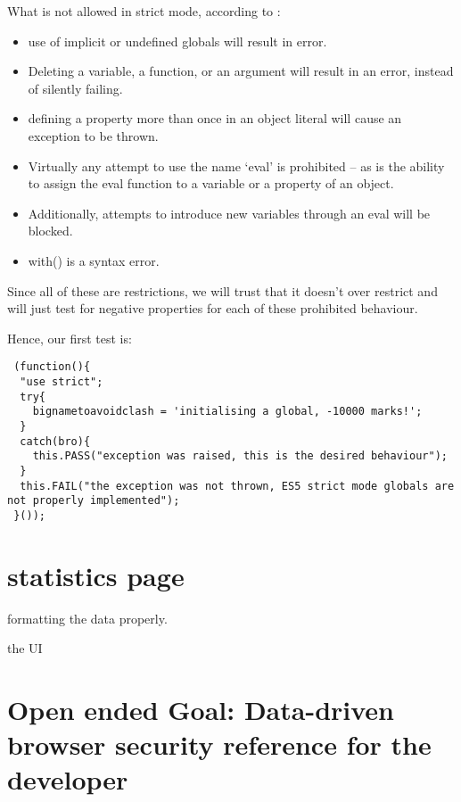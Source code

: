 What is not allowed in strict mode, according to \cite{resig}:
\begin{itemize}
 \item use of implicit or undefined globals will result in error.
 \item Deleting a variable, a function, or an argument will result in an error, instead of silently failing.
 \item defining a property more than once in an object literal will cause an exception to be thrown.
 \item Virtually any attempt to use the name ‘eval’ is prohibited – as is the ability to assign the eval function to a variable or a property of an object.
 \item Additionally, attempts to introduce new variables through an eval will be blocked.
 \item with(){} is a syntax error.
\end{itemize}

Since all of these are restrictions, we will trust that it doesn't over restrict and will just test for negative properties for each of these prohibited behaviour.\

Hence, our first test is:

\begin{verbatim}
 (function(){
  "use strict";
  try{
    bignametoavoidclash = 'initialising a global, -10000 marks!';
  }
  catch(bro){
    this.PASS("exception was raised, this is the desired behaviour");
  }
  this.FAIL("the exception was not thrown, ES5 strict mode globals are not properly implemented");
 }());
\end{verbatim}

\section{statistics page}

formatting the data properly.


the UI 


\section{Open ended Goal: Data-driven browser security reference for the developer }